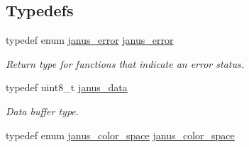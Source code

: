 \subsection*{Typedefs}
\begin{DoxyCompactItemize}
\item 
typedef enum \hyperlink{group__janus_ga1b275e4dade484951b366f785597b8f6}{janus\+\_\+error} \hyperlink{group__janus_ga8d1da4647fdb996401e33bc8c40ea773}{janus\+\_\+error}
\begin{DoxyCompactList}\small\item\em Return type for functions that indicate an error status. \end{DoxyCompactList}\item 
\hypertarget{group__janus_gab23d3331754844d0a5e80fcfad4d32c0}{}typedef uint8\+\_\+t \hyperlink{group__janus_gab23d3331754844d0a5e80fcfad4d32c0}{janus\+\_\+data}\label{group__janus_gab23d3331754844d0a5e80fcfad4d32c0}

\begin{DoxyCompactList}\small\item\em Data buffer type. \end{DoxyCompactList}\item 
\hypertarget{group__janus_ga79a4a3c22a3476037a952d37eeb1a73f}{}typedef enum \hyperlink{group__janus_gac189bebcbab53c752990509cb48ccd4c}{janus\+\_\+color\+\_\+space} \hyperlink{group__janus_ga79a4a3c22a3476037a952d37eeb1a73f}{janus\+\_\+color\+\_\+space}\label{group__janus_ga79a4a3c22a3476037a952d37eeb1a73f}


\end{DoxyCompactItemize}
